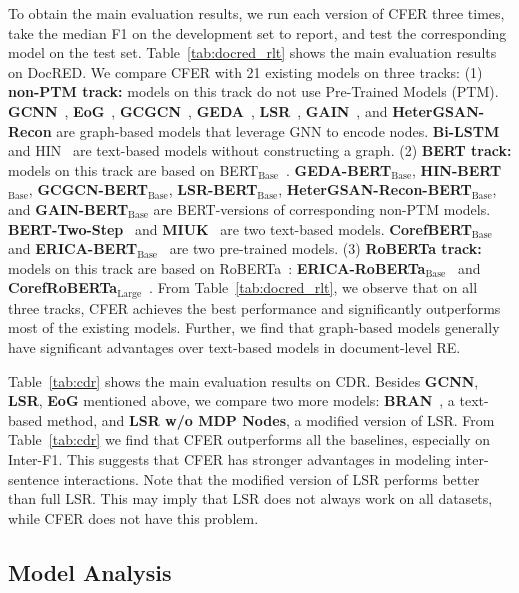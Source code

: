 \documentclass{article}
\newcommand{\citep}{\cite}
\begin{document}
To obtain the main evaluation results, we run each version of CFER three times, take the median F1 on the development set to report, and test the corresponding model on the test set. 
Table~\ref{tab:docred_rlt} shows the main evaluation results on DocRED. 
We compare CFER with 21 existing models on three tracks: 
(1) \textbf{non-PTM track:}
models on this track do not use Pre-Trained Models (PTM). 
\textbf{GCNN}~\citep{gcnn}, \textbf{EoG}~\citep{eog}, \textbf{GCGCN}~\citep{gcgcn}, \textbf{GEDA}~\citep{geda}, \textbf{LSR}~\citep{lsr},  \textbf{GAIN}~\citep{gain}, and \textbf{HeterGSAN-Recon} are graph-based models that leverage GNN to encode nodes. 
\textbf{Bi-LSTM}~\citep{docred} and HIN~\citep{hin} are text-based models without constructing a graph. 
(2) \textbf{BERT track:}
models on this track are based on BERT$_\text{Base}$~\citep{bert}. 
\textbf{GEDA-BERT$_{\text{Base}}$}, \textbf{HIN-BERT$_{\text{Base}}$}, \textbf{GCGCN-BERT$_{\text{Base}}$}, \textbf{LSR-BERT$_{\text{Base}}$}, \textbf{HeterGSAN-Recon-BERT$_{\text{Base}}$}, and \textbf{GAIN-BERT$_{\text{Base}}$} are BERT-versions of corresponding non-PTM models. 
\textbf{BERT-Two-Step}~\citep{bert_two_step} and \textbf{MIUK}~\citep{miuk} are two text-based models. 
\textbf{CorefBERT$_{\text{Base}}$}~\citep{coref_bert} and \textbf{ERICA-BERT$_{\text{Base}}$}~\citep{erica} are two pre-trained models. 
(3) \textbf{RoBERTa track:}
models on this track are based on RoBERTa~\citep{roberta}: \textbf{ERICA-RoBERTa$_{\text{Base}}$}~\citep{erica} and \textbf{CorefRoBERTa$_{\text{Large}}$}~\citep{coref_bert}.  
From Table~\ref{tab:docred_rlt}, we observe that 
on all three tracks, CFER achieves the best performance and significantly outperforms most of the existing models. 
Further, we find that graph-based models generally have significant advantages over text-based models in document-level RE. 

Table~\ref{tab:cdr} shows the main evaluation results on CDR. 
Besides \textbf{GCNN}, \textbf{LSR}, \textbf{EoG} mentioned above, we compare two more models: \textbf{BRAN}~\citep{barn}, a text-based method, and \textbf{LSR w/o MDP Nodes}, a modified version of LSR. 
From Table~\ref{tab:cdr} we find that CFER outperforms all the baselines, especially on Inter-F1. 
This suggests that CFER has stronger advantages in modeling inter-sentence interactions. 
Note that the modified version of LSR performs better than full LSR. 
This may imply that LSR does not always work on all datasets, while CFER does not have this problem. 

\subsection{Model Analysis}
\end{document}
